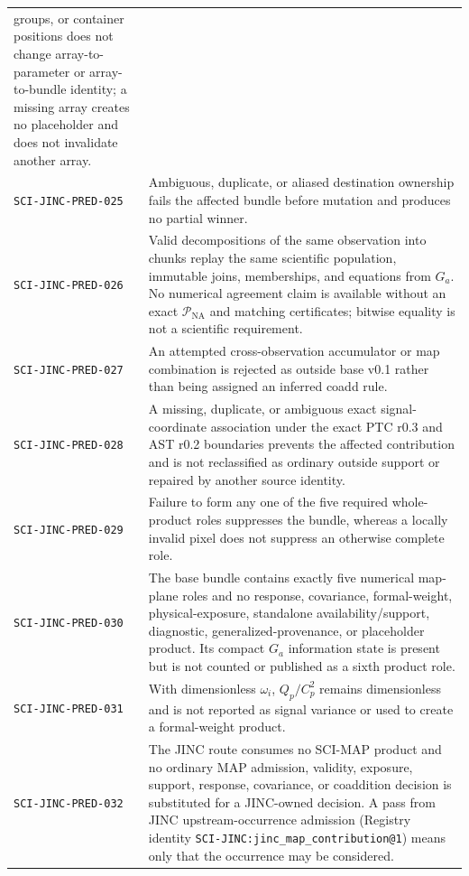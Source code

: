 \begin{longtable}{@{}>{\raggedright\arraybackslash}p{}
                        >{\raggedright\arraybackslash}p{}@{}}
groups, or container positions does not change array-to-parameter or
array-to-bundle identity; a missing array creates no placeholder and does not
invalidate another array. \\
\texttt{SCI-JINC-PRED-025} & Ambiguous, duplicate, or aliased destination
ownership fails the affected bundle before mutation and produces no partial
winner. \\
\texttt{SCI-JINC-PRED-026} & Valid decompositions of the same observation into
chunks replay the same scientific population, immutable joins, memberships,
and equations from $G_a$.  No numerical agreement claim is available without
an exact $\mathcal{P}_{\mathrm{NA}}$ and matching certificates; bitwise
equality is not a scientific requirement. \\
\texttt{SCI-JINC-PRED-027} & An attempted cross-observation accumulator or map
combination is rejected as outside base v0.1 rather than being assigned an
inferred coadd rule. \\
\texttt{SCI-JINC-PRED-028} & A missing, duplicate, or ambiguous exact
signal-coordinate association under the exact PTC r0.3 and AST r0.2
boundaries prevents the affected contribution and is not reclassified as
ordinary outside support or repaired by another source identity. \\
\texttt{SCI-JINC-PRED-029} & Failure to form any one of the five required
whole-product roles suppresses the bundle, whereas a locally invalid pixel
does not suppress an otherwise complete role. \\
\texttt{SCI-JINC-PRED-030} & The base bundle contains exactly five numerical
map-plane roles and no response, covariance, formal-weight, physical-exposure,
standalone availability/support, diagnostic, generalized-provenance, or
placeholder product.  Its compact $G_a$ information state is present but is
not counted or published as a sixth product role. \\
\texttt{SCI-JINC-PRED-031} & With dimensionless $\omega_i$,
$Q_p/C_p^2$ remains dimensionless and is not reported as signal variance or
used to create a formal-weight product. \\
\texttt{SCI-JINC-PRED-032} & The JINC route consumes no SCI-MAP product and no
ordinary MAP admission, validity, exposure, support, response, covariance, or
coaddition decision is substituted for a JINC-owned decision.  A pass from
JINC upstream-occurrence admission (Registry identity
\texttt{SCI-JINC:jinc\_map\_contribution@1}) means only that the occurrence
may be considered. \\

\end{longtable}
